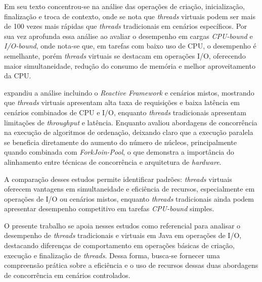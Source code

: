 \documentclass[12pt, openright, oneside, a4paper, english,	french,	spanish, brazil	]{abntex2}
\begin{document}
    Em seu texto  concentrou-se na análise das operações de criação, inicialização, finalização e troca de contexto, onde se nota que \textit{threads} virtuais podem ser mais de 100 vezes mais rápidas que \textit{threads} tradicionais em cenários específicos. Por sua vez  aprofunda essa análise ao avaliar o desempenho em cargas \textit{CPU-bound} e \textit{I/O-bound}, onde nota-se que, em tarefas com baixo uso de CPU, o desempenho é semelhante, porém \textit{threads} virtuais se destacam em operações I/O, oferecendo maior simultaneidade, redução do consumo de memória e melhor aproveitamento da CPU.

     expandiu a análise incluindo o \textit{Reactive Framework} e cenários mistos, mostrando que \textit{threads} virtuais apresentam alta taxa de requisições e baixa latência em cenários combinados de CPU e I/O, enquanto \textit{threads} tradicionais apresentam limitações de \textit{throughput} e latência. Enquanto  avaliou abordagens de concorrência na execução de algoritmos de ordenação, deixando claro que a execução paralela se beneficia diretamente do aumento do número de núcleos, principalmente quando combinada com \textit{ForkJoin-Pool}, o que demonstra a importância do alinhamento entre técnicas de concorrência e arquitetura de \textit{hardware}.

    A comparação desses estudos permite identificar padrões: \textit{threads} virtuais oferecem vantagens em simultaneidade e eficiência de recursos, especialmente em operações de I/O ou cenários mistos, enquanto \textit{threads} tradicionais ainda podem apresentar desempenho competitivo em tarefas \textit{CPU-bound} simples.

    O presente trabalho se apoia nesses estudos como referencial para analisar o desempenho de \textit{threads} tradicionais e virtuais em Java em operações de I/O, destacando diferenças de comportamento em operações básicas de criação, execução e finalização de \textit{threads}. Dessa forma, busca-se fornecer uma compreensão prática sobre a eficiência e o uso de recursos dessas duas abordagens de concorrência em cenários controlados.
  
\end{document}
